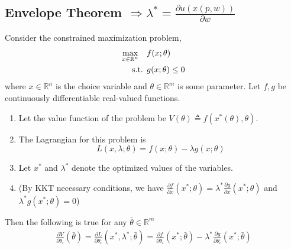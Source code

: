 \documentclass[11pt]{elegantbook}
\begin{document}
\subsection{Envelope Theorem $\Rightarrow \lambda^{*}=\frac{\partial u(x(p, w))}{\partial w}$}
\begin{theorem}
    Consider the constrained maximization problem,
    \begin{equation}
        \begin{aligned}
            \max_{x\in \mathbb{R}^n}\quad & f(x;\theta)\\
            \textnormal{s.t. }& g(x;\theta)\leq 0
        \end{aligned}
        \nonumber
    \end{equation}
    where $x\in \mathbb{R}^n$ is the choice variable and $\theta\in \mathbb{R}^m$ is some parameter. Let $f,g$ be continuously differentiable real-valued functions.
    \begin{enumerate}[$\bullet$]
        \item Let the value function of the problem be $V(\theta)\triangleq f(x^*(\theta),\theta)$.
        \item The Lagrangian for this problem is $$L(x,\lambda;\theta)=f(x; \theta)-\lambda g(x; \theta)$$
        \item Let $x^{*}$ and $\lambda^{*}$ denote the optimized values of the variables.
        \item[](By KKT necessary conditions, we have $\frac{\partial f}{\partial x}(x^*;\theta)=\lambda^* \frac{\partial g}{\partial x}(x^*;\theta)$ and $\lambda^* g(x^*;\theta)=0$)
    \end{enumerate}
    Then the following is true for any $\bar{\theta}\in \mathbb{R}^m$
    \begin{equation}
        \begin{aligned}
            \frac{\partial V}{\partial \theta_i}(\bar{\theta})=\frac{\partial L}{\partial \theta_i}(x^{*}, \lambda^{*};\bar{\theta})=\frac{\partial f}{\partial \theta_i}(x^{*};\bar{\theta})-\lambda^*\frac{\partial g}{\partial \theta_i}(x^{*};\bar{\theta})
        \end{aligned}
        \nonumber
    \end{equation}
\end{theorem}
\end{document}
